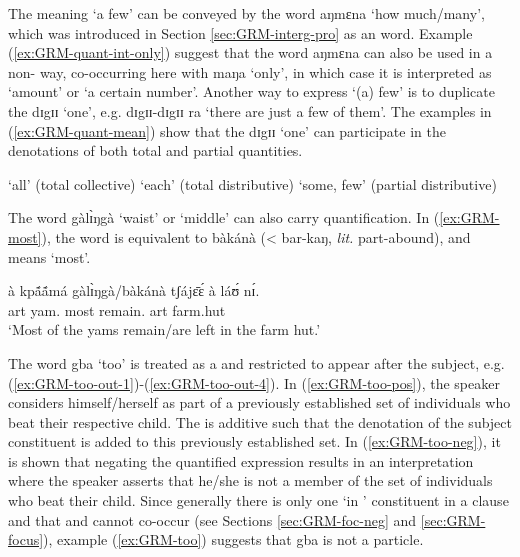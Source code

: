\begin{exe}
\begin{exe}
\begin{exe}
\begin{exe}
\begin{exe}
\begin{exe}
\begin{exe}
\begin{exe}
\begin{exe}
The meaning `a few' can be conveyed by  the word {\sls aŋmɛna} `how much/many', which was introduced in Section \ref{sec:GRM-interg-pro} as an  word. Example  (\ref{ex:GRM-quant-int-only}) suggest that the word {\sls aŋmɛna} can also be used in a non- way,  co-occurring here with {\sls maŋa} `only',  in which case it is interpreted  as `amount' or `a certain number'. Another way to express `(a) few'  is to duplicate the  {\sls dɪgɪɪ} `one', e.g. {\sls dɪgɪɪ-dɪgɪɪ ra} `there are just a few of them'.  The  examples in (\ref{ex:GRM-quant-mean}) show that the  {\sls dɪgɪɪ} `one' can participate in the denotations of both total and partial quantities. 


\ea\label{ex:GRM-quant-mean}
  {\rm `all' (total collective)}
  {\rm `each' (total distributive)}
  {\rm `some, few' (partial distributive)}

\z 
 \z
 
The word {\sls gàlɪ̀ŋgà} `waist' or `middle'  can also carry quantification. In (\ref{ex:GRM-most}),  the word is equivalent to {\sls bàkánà} (< {\sls bar-kaŋ}, {\it lit.} part-abound),  and means `most'.


\begin{exe}
 \ex\label{ex:GRM-most}
\gll   à kpã́ã́má  gàlɪ̀ŋgà/bàkánà tʃájɛ̄ɛ́ à láʊ́ nɪ́.\\
{\sc art} yam.{\pl} most remain.{\pfv} {\sc art} farm.hut {\postp}\\
\glt  `Most of the yams remain/are left in the farm hut.'
\z

The word {\sls gba} `too' is treated as a  and restricted to appear after the subject, e.g. (\ref{ex:GRM-too-out-1})-(\ref{ex:GRM-too-out-4}). In (\ref{ex:GRM-too-pos}), the speaker  considers himself/herself  as part of a previously established set of individuals who beat their respective child. The  is additive such that  the denotation of the subject constituent is added to this previously established set.  In (\ref{ex:GRM-too-neg}), it is shown that negating the quantified expression results in an interpretation where the speaker asserts that he/she is not a member of the set of individuals who beat their child. Since generally there is only one `in ' constituent in a clause and that  and  cannot co-occur (see Sections \ref{sec:GRM-foc-neg} and  \ref{sec:GRM-focus}), example (\ref{ex:GRM-too}) suggests that {\sls gba} is not a  particle.


\end{exe}
\end{exe}
\end{exe}
\end{exe}
\end{exe}
\end{exe}
\end{exe}
\end{exe}
\end{exe}
\end{exe}
